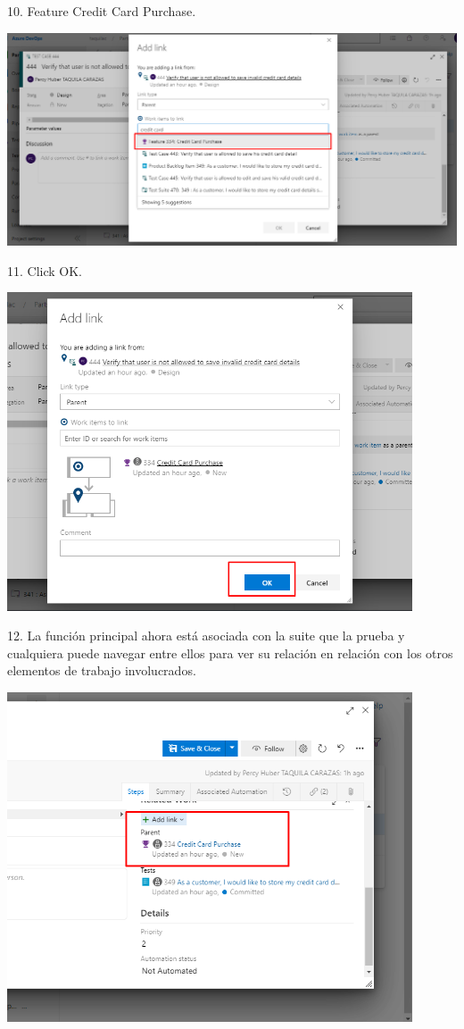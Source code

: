 \documentclass[12pt,letterpaper]{article}
\begin{document}
10. Feature Credit Card Purchase.

\begin{center}
		\includegraphics[width=15cm]{./Imagenes/9} 
\end{center}

11. Click OK.

\begin{center}
		\includegraphics[width=12cm]{./Imagenes/10} 
\end{center}

12. La función principal ahora está asociada con la suite que la prueba y cualquiera puede navegar entre ellos para ver su relación en relación con los otros elementos de trabajo involucrados.

\begin{center}
		\includegraphics[width=12cm]{./Imagenes/11} 
\end{center}
\end{document}
